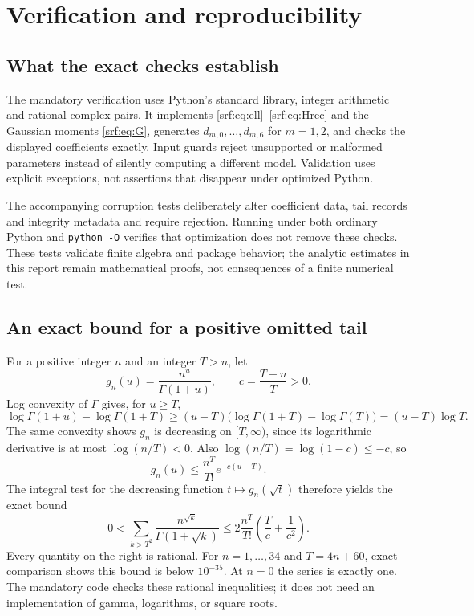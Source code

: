 \documentclass[11pt]{article}
\theoremstyle{remark}\newtheorem{remark}[theorem]{Remark}
\begin{document}
\section{Verification and reproducibility}\label{srf:sec:verification}
\subsection{What the exact checks establish}
The mandatory verification uses Python's standard library, integer arithmetic and rational complex pairs. It implements \eqref{srf:eq:ell}--\eqref{srf:eq:Hrec} and the Gaussian moments \eqref{srf:eq:G}, generates $d_{m,0},\ldots,d_{m,6}$ for $m=1,2$, and checks the displayed coefficients exactly. Input guards reject unsupported or malformed parameters instead of silently computing a different model. Validation uses explicit exceptions, not assertions that disappear under optimized Python.

The accompanying corruption tests deliberately alter coefficient data, tail records and integrity metadata and require rejection. Running under both ordinary Python and \texttt{python -O} verifies that optimization does not remove these checks. These tests validate finite algebra and package behavior; the analytic estimates in this report remain mathematical proofs, not consequences of a finite numerical test.

\subsection{An exact bound for a positive omitted tail}
For a positive integer $n$ and an integer $T>n$, let
\[
 g_n(u)=\frac{n^u}{\Gamma(1+u)},\qquad c=\frac{T-n}{T}>0.
\]
Log convexity of $\Gamma$ gives, for $u\ge T$,
\[
 \log\Gamma(1+u)-\log\Gamma(1+T)
    \ge(u-T)\bigl(\log\Gamma(1+T)-\log\Gamma(T)\bigr)
    =(u-T)\log T.
\]
The same convexity shows $g_n$ is decreasing on $[T,\infty)$, since its logarithmic derivative is at most $\log(n/T)<0$. Also $\log(n/T)=\log(1-c)\le-c$, so
\[
 g_n(u)\le\frac{n^T}{T!}e^{-c(u-T)}.
\]
The integral test for the decreasing function $t\mapsto g_n(\sqrt t)$ therefore yields the exact bound
\begin{equation}\label{srf:eq:numerictail}
 0<\sum_{k>T^2}\frac{n^{\sqrt k}}{\Gamma(1+\sqrt k)}
 \le2\frac{n^T}{T!}\left(\frac{T}{c}+\frac1{c^2}\right).
\end{equation}
Every quantity on the right is rational. For $n=1,\ldots,34$ and $T=4n+60$, exact comparison shows this bound is below $10^{-35}$. At $n=0$ the series is exactly one. The mandatory code checks these rational inequalities; it does not need an implementation of gamma, logarithms, or square roots.
\end{document}
